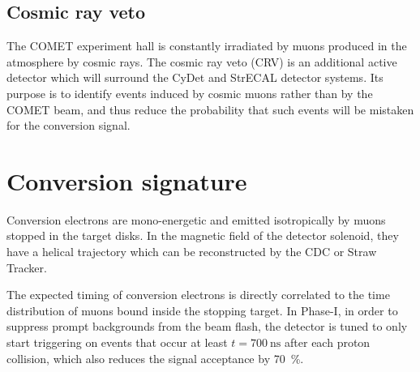 




\subsection{Cosmic ray veto}
The COMET experiment hall is constantly irradiated by muons produced in the
atmosphere by cosmic rays. The cosmic ray veto (CRV) is an additional active
detector which will surround the CyDet and StrECAL detector systems. Its purpose
is to identify events induced by cosmic muons rather than by the COMET beam, and
thus reduce the probability that such events will be mistaken for the conversion
signal.


\section{Conversion signature}
Conversion electrons are mono-energetic and emitted isotropically by muons
stopped in the target disks. In the magnetic field of the detector solenoid,
they have a helical trajectory which can be reconstructed by the CDC or Straw
Tracker.

The expected timing of conversion electrons is directly correlated to the time
distribution of muons bound inside the stopping target. In Phase-I, in order to
suppress prompt backgrounds from the beam flash, the detector is tuned to only
start triggering on events that occur at least $t=\SI{700}{\ns}$ after each
proton collision, which also reduces the signal acceptance by \SI{70}{\percent}.




